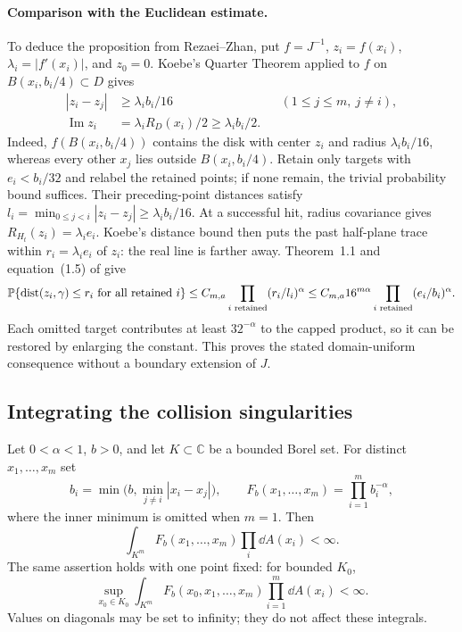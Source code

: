 \paragraph{Comparison with the Euclidean estimate.}
To deduce the proposition from Rezaei--Zhan, put $f=J^{-1}$,
$z_i=f(x_i)$, $\lambda_i=|f'(x_i)|$, and $z_0=0$.
Koebe's Quarter Theorem applied to $f$ on $B(x_i,b_i/4)\subset D$
gives
\begin{align*}
 |z_i-z_j|&\ge\lambda_i b_i/16
                   &&(1\le j\le m,\ j\ne i),\\
 \operatorname{Im}z_i
 &=\lambda_iR_D(x_i)/2\ge\lambda_i b_i/2.
\end{align*}
Indeed, $f(B(x_i,b_i/4))$ contains the disk with center $z_i$ and
radius $\lambda_i b_i/16$, whereas every other $x_j$ lies outside
$B(x_i,b_i/4)$. Retain only targets with $e_i<b_i/32$ and relabel
the retained points; if none remain, the trivial probability bound
suffices. Their preceding-point distances satisfy
$l_i=\min_{0\le j<i}|z_i-z_j|\ge\lambda_i b_i/16$.
At a successful hit, radius covariance gives
$R_{H_t}(z_i)=\lambda_i e_i$. Koebe's distance
bound then puts the past half-plane trace within
$r_i=\lambda_i e_i$ of $z_i$: the real line is farther away.
Theorem~1.1 and equation~(1.5) of \cite{RezaeiZhan2017} give
\[
 \mathbb P\{\operatorname{dist}(z_i,\gamma)\le r_i\text{ for all retained }i\}
 \le C_{m,a}\prod_{i\text{ retained}}(r_i/l_i)^\alpha
 \le C_{m,a}16^{m\alpha}
             \prod_{i\text{ retained}}(e_i/b_i)^\alpha.
\]
Each omitted target contributes at least $32^{-\alpha}$ to the capped
product, so it can
be restored by enlarging the constant. This proves the stated
domain-uniform consequence without a boundary extension of $J$.

\subsection{Integrating the collision singularities}

\begin{lemma}\label{mp:kernel-integral}
Let $0<\alpha<1$, $b>0$, and let $K\subset\mathbb C$ be a bounded Borel set.
For distinct $x_1,\ldots,x_m$ set
\[
 b_i=\min\bigl(b,\min_{j\ne i}|x_i-x_j|\bigr),\qquad
 F_b(x_1,\ldots,x_m)=\prod_{i=1}^m b_i^{-\alpha},
\]
where the inner minimum is omitted when $m=1$. Then
\begin{equation}
 \int_{K^m}F_b(x_1,\ldots,x_m)\prod_i\dd A(x_i)<\infty.
 \label{mp:all-variable-integral}
\end{equation}
The same assertion holds with one point fixed: for bounded $K_0$,
\begin{equation}
 \sup_{x_0\in K_0}\int_{K^m}
 F_b(x_0,x_1,\ldots,x_m)\prod_{i=1}^m\dd A(x_i)<\infty.
 \label{mp:fixed-center-integral}
\end{equation}
Values on diagonals may be set to infinity; they do not affect these
integrals.
\end{lemma}

